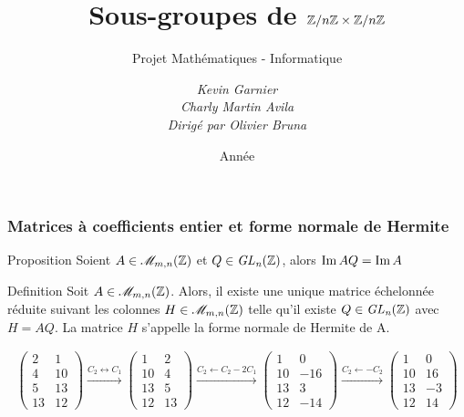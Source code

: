 \documentclass[10pt]{beamer}
\title{Sous-groupes de $\mathbb Z/n\mathbb Z \times \mathbb Z/n\mathbb Z$}
\subtitle{Projet Mathématiques - Informatique}
\author[Kevin Garnier, Charly Martin Avila, Olivier Brunat]{
	\itshape {Kevin Garnier \\
		Charly Martin Avila}\\
		\vspace*{1cm}
	Dirigé par
	Olivier Bruna
}
\date{Année \the\year}
\begin{document}
\begin{frame}
	\titlepage
\end{frame}

\begin{frame}
	\frametitle{Matrices à coefficients entier et forme normale de Hermite}
	\begin{block}{Proposition}
		\label{ima_imaq}
		Soient $A \in \mathscr{M}_{m,n}(\mathbb Z)$ et $Q \in \it {GL}_n(\mathbb Z)$, alors
		$\operatorname{Im} AQ = \operatorname{Im} A$
	\end{block}
	\begin{alertblock}{Definition}
		Soit $A \in \mathscr{M}_{m,n}(\mathbb Z)$. Alors, il existe une unique matrice échelonnée
		réduite suivant les colonnes $H \in \mathscr{M}_{m,n}(\mathbb Z)$ telle qu'il existe $Q \in \it {GL}_n(\mathbb Z)$
		avec $H = AQ$. La matrice $H$ s'appelle la forme normale de Hermite de A.
	\end{alertblock}
	\begin{example}
		\begin{equation*}
			\begin{split}
				\begin{pmatrix}
					2  & 1  \\
					4  & 10 \\
					5  & 13 \\
					13 & 12
				\end{pmatrix}
				\overset{C_2 \leftrightarrow C_1}{\longrightarrow}
				\begin{pmatrix}
					1  & 2  \\
					10 & 4  \\
					13 & 5  \\
					12 & 13
				\end{pmatrix}
				\overset{C_2 \leftarrow C_2 - 2C_1}{\longrightarrow}
				\begin{pmatrix}
					1  & 0   \\
					10 & -16 \\
					13 & 3   \\
					12 & -14
				\end{pmatrix}
				\overset{C_2 \leftarrow - C_2}{\longrightarrow}
				\begin{pmatrix}
					1  & 0  \\
					10 & 16 \\
					13 & -3 \\
					12 & 14
				\end{pmatrix}
			\end{split}
		\end{equation*}
	\end{example}
\end{frame}
\end{document}
